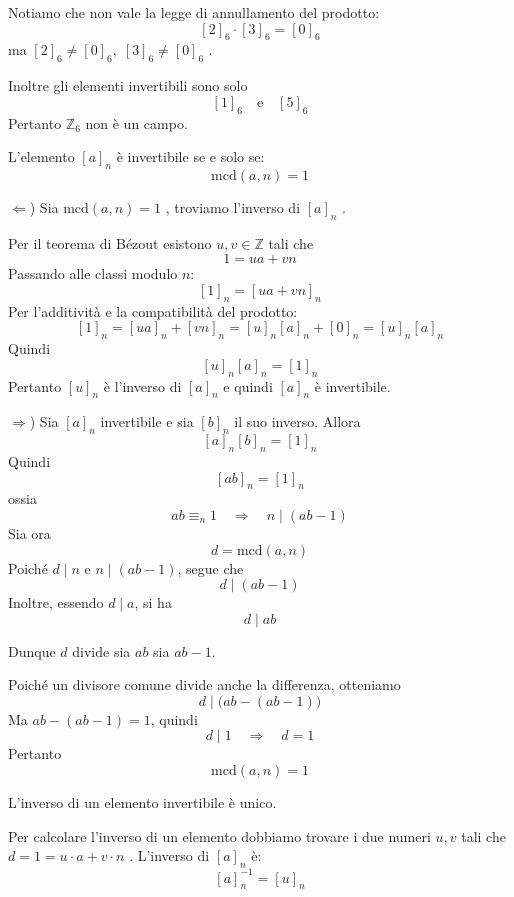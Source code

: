 \documentclass[
  a4paper,
]{article}
\begin{document}
\begin{examplebox}
Notiamo che non vale la legge di annullamento del prodotto: \[
[2]_6 \cdot [3]_6 = [0]_6
\] ma \([2]_6 \neq [0]_6,\;[3]_6 \neq [0]_6\) .

Inoltre gli elementi invertibili sono solo \[
[1]_6
\quad \text{e} \quad
[5]_6
\] Pertanto \(\mathbb Z_6\) non è un campo.
\end{examplebox}

\begin{propositionbox}
L'elemento \(\left[a\right]_n\) è invertibile se e solo se: \[
\text{mcd}(a,n)=1
\]
\end{propositionbox}

\begin{proofbox}
\(\Leftarrow\)) Sia \(\text{mcd}(a,n)=1\) , troviamo l'inverso di
\([a]_n\) .

Per il teorema di Bézout esistono \(u,v\in\mathbb Z\) tali che \[
1 = ua + vn
\] Passando alle classi modulo \(n\): \[
[1]_n = [ua+vn]_n
\] Per l'additività e la compatibilità del prodotto: \[
[1]_n
=
[ua]_n + [vn]_n
=
[u]_n[a]_n + [0]_n
=
[u]_n[a]_n
\] Quindi \[
[u]_n[a]_n=[1]_n
\] Pertanto \([u]_n\) è l'inverso di \([a]_n\) e quindi \([a]_n\) è
invertibile.

\bigskip

\(\Rightarrow\)) Sia \([a]_n\) invertibile e sia \([b]_n\) il suo
inverso. Allora \[
[a]_n[b]_n=[1]_n
\] Quindi \[
[ab]_n=[1]_n
\] ossia \[
ab \equiv_n 1 \quad \Longrightarrow \quad n \mid (ab-1)
\] Sia ora \[
d=\text{mcd}(a,n)
\] Poiché \(d\mid n\) e \(n\mid(ab-1)\), segue che \[
d\mid(ab-1)
\] Inoltre, essendo \(d\mid a\), si ha \[
d\mid ab
\]

Dunque \(d\) divide sia \(ab\) sia \(ab-1\).

Poiché un divisore comune divide anche la differenza, otteniamo \[
d \mid \bigl(ab-(ab-1)\bigr)
\] Ma \(ab-(ab-1)=1\), quindi \[
d\mid 1 \quad \Longrightarrow \quad d = 1
\] Pertanto \[
\text{mcd}(a,n)=1
\]
\end{proofbox}

\begin{observationbox}
L'inverso di un elemento invertibile è unico.
\end{observationbox}

\begin{observationbox}
Per calcolare l'inverso di un elemento dobbiamo trovare i due numeri
\(u, v\) tali che \(d = 1 = u\cdot a + v\cdot n\) . L'inverso di
\([a]_n\) è: \[
[a]_n^{-1} = [u]_n
\]
\end{observationbox}
\end{document}
